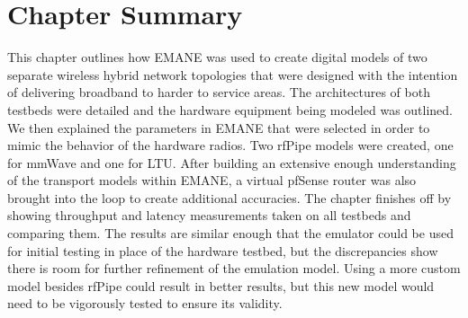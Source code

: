 \section{Chapter Summary}
This chapter outlines how EMANE was used to create digital models of two separate wireless hybrid network topologies that were designed with the intention of delivering broadband to harder to service areas.
The architectures of both testbeds were detailed and the hardware equipment being modeled was outlined.
We then explained the parameters in EMANE that were selected in order to mimic the behavior of the hardware radios. Two rfPipe models were created, one for mmWave and one for LTU.
After building an extensive enough understanding of the transport models within EMANE, a virtual pfSense router was also brought into the loop to create additional accuracies.
The chapter finishes off by showing throughput and latency measurements taken on all testbeds and comparing them.
The results are similar enough that the emulator could be used for initial testing in place of the hardware testbed, but the discrepancies show there is room for further refinement of the emulation model.
Using a more custom model besides rfPipe could result in better results, but this new model would need to be vigorously tested to ensure its validity.